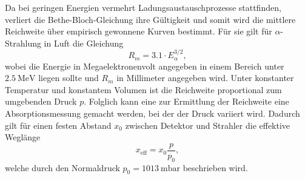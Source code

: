 Da bei geringen Energien vermehrt Ladungsaustauschprozesse stattfinden, verliert die Bethe-Bloch-Gleichung ihre Gültigkeit und somit wird die mittlere Reichweite über empirisch gewonnene Kurven bestimmt.
Für sie gilt für $\alpha$-Strahlung in Luft die Gleichung
\begin{equation}
  R_m = \num{3.1} \cdot E_{\alpha}^{3/2}, \label{emp}
\end{equation}
wobei die Energie in Megaelektronenvolt angegeben in einem Bereich unter $\SI{2,5}{\mega\electronvolt}$ liegen sollte und $R_m$ in Millimeter angegeben wird.
Unter konstanter Temperatur und konstantem Volumen ist die Reichweite proportional zum umgebenden Druck $p$.
Folglich kann eine zur Ermittlung der Reichweite eine Absorptionsmessung gemacht werden, bei der der Druck variiert wird.
Dadurch gilt für einen festen Abstand $x_0$ zwischen Detektor und Strahler die effektive Weglänge
\begin{equation}
  x_{\text{eff}} = x_0 \frac{p}{p_0},
  \label{eqn:xeff}
\end{equation}
welche durch den Normaldruck $p_0 = \SI{1013}{\milli\bar}$ beschrieben wird. \cite{skript}

